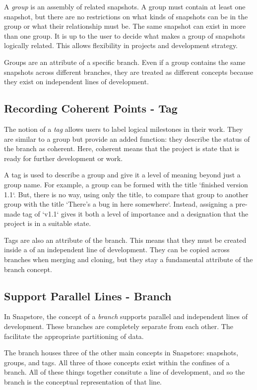 A \textit{group} is an assembly of related snapshots. A group must contain at least one snapshot, but there are no restrictions on what kinds of snapshots can be in the group or what their relationship must be. The same snapshot can exist in more than one group. It is up to the user to decide what makes a group of snapshots logically related. This allows flexibility in projects and development strategy.

Groups are an attribute of a specific branch. Even if a group contains the same snapshots across different branches, they are treated as different concepts because they exist on independent lines of development. 

\subsection{Recording Coherent Points - Tag}

The notion of a \textit{tag} allows users to label logical milestones in their work. They are similar to a group but provide an added function: they describe the status of the branch as coherent. Here, coherent means that the project is state that is ready for further development or work.

A tag is used to describe a group and give it a level of meaning beyond just a group name. For example, a group can be formed with the title `finished version 1.1`. But, there is no way, using only the title, to compare that group to another group with the title `There's a bug in here somewhere`. Instead, assigning a pre-made tag of `v1.1` gives it both a level of importance and a designation that the project is in a suitable state.

Tags are also an attribute of the branch. This means that they must be created inside a of an independent line of development. They can be copied across branches when merging and cloning, but they stay a fundamental attribute of the branch concept.

\subsection{Support Parallel Lines - Branch}

In Snapstore, the concept of a \textit{branch} supports parallel and independent lines of development. These branches are completely separate from each other. The facilitate the appropriate partitioning of data.

The branch houses three of the other main concepts in Snapstore: snapshots, groups, and tags. All three of those concepts exist within the confines of a branch. All of these things together consitute a line of development, and so the branch is the conceptual representation of that line.

